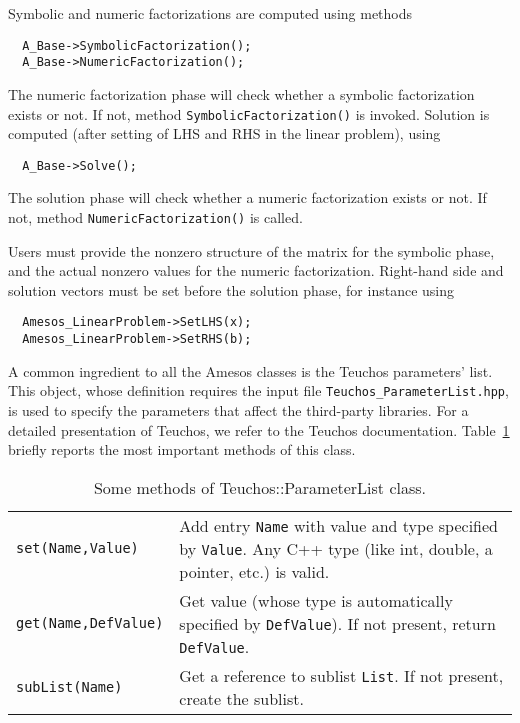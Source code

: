\documentclass[11pt]{SANDreport}
\begin{document}
Symbolic and numeric factorizations are computed using methods
\begin{verbatim}
  A_Base->SymbolicFactorization();
  A_Base->NumericFactorization();
\end{verbatim}
The numeric factorization phase will check whether a symbolic
factorization exists or not. If not, method
\verb!SymbolicFactorization()! is invoked.  Solution is computed (after
setting of LHS and RHS in the linear problem), using
\begin{verbatim}
  A_Base->Solve();
\end{verbatim}
The solution phase will check whether a numeric factorization exists or
not. If not, method \verb!NumericFactorization()! is called.

Users must provide the nonzero structure of the matrix for the symbolic
phase, and the actual nonzero values for the numeric
factorization. Right-hand side and solution vectors must be set before
the solution phase, for instance using
\begin{verbatim}
  Amesos_LinearProblem->SetLHS(x);
  Amesos_LinearProblem->SetRHS(b);
\end{verbatim}

A common ingredient to all the Amesos classes is the Teuchos parameters'
list. This object, whose definition requires the input file
\verb!Teuchos_ParameterList.hpp!, is used to specify the parameters that
affect the third-party libraries. For a detailed presentation of Teuchos, we
refer to the Teuchos documentation. 
Table~\ref{tab:teuchos} briefly reports the most
important methods of this class.

\begin{table}[htbp]
  \centering
  \begin{tabular}{| p{4cm} | p{10cm} |}
    \hline
    \verb!set(Name,Value)! & Add entry \verb!Name! with value and type
    specified by \verb!Value!. Any C++ type (like int, double, a
    pointer, etc.) is valid. \\
    \verb!get(Name,DefValue)! & Get value (whose type is automatically
    specified by \verb!DefValue!). If not present, return
    \verb!DefValue!. \\
    \verb!subList(Name)! & Get a reference to sublist \verb!List!. If not
    present, create the sublist. \\
    \hline
  \end{tabular}
  \caption{Some methods of Teuchos::ParameterList class.}
  \label{tab:teuchos}
\end{table}
\end{document}
